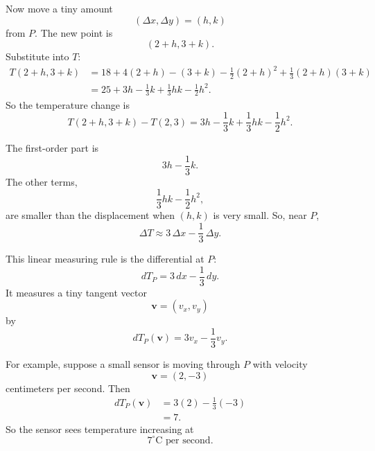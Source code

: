 Now move a tiny amount
\[
    (\Delta x,\Delta y)=(h,k)
\]
from \(P\).  The new point is
\[
    (2+h,3+k).
\]
Substitute into \(T\):
\[
\begin{aligned}
T(2+h,3+k)
&=
18+4(2+h)-(3+k)-\frac12(2+h)^2
+\frac13(2+h)(3+k)\\
&=
25+3h-\frac13k+\frac13hk-\frac12h^2.
\end{aligned}
\]
So the temperature change is
\[
    T(2+h,3+k)-T(2,3)
    =
    3h-\frac13k+\frac13hk-\frac12h^2.
\]

The first-order part is
\[
    3h-\frac13k.
\]
The other terms,
\[
    \frac13hk-\frac12h^2,
\]
are smaller than the displacement when \((h,k)\) is very small.  So, near \(P\),
\[
    \Delta T\approx 3\,\Delta x-\frac13\,\Delta y.
\]

This linear measuring rule is the differential at \(P\):
\[
\boxed{
    dT_P=3\,dx-\frac13\,dy.
}
\]
It measures a tiny tangent vector
\[
    \mathbf v=(v_x,v_y)
\]
by
\[
    dT_P(\mathbf v)=3v_x-\frac13v_y.
\]

For example, suppose a small sensor is moving through \(P\) with velocity
\[
    \mathbf v=(2,-3)
\]
centimeters per second.  Then
\[
\begin{aligned}
    dT_P(\mathbf v)
    &=
    3(2)-\frac13(-3)\\
    &=
    7.
\end{aligned}
\]
So the sensor sees temperature increasing at
\[
    7^\circ\text{C per second}.
\]


